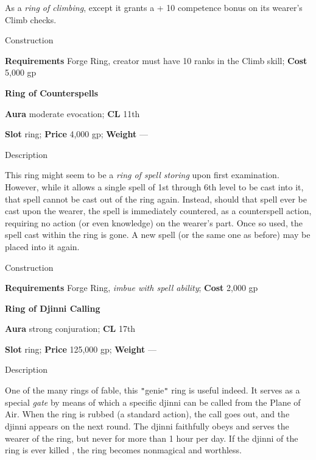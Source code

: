 As a \textit{ring of climbing}, except it grants a +
10 competence
 bonus on its wearer's Climb checks. 
				
Construction
				
\textbf{Requirements} Forge Ring, creator must have 10 ranks in the Climb skill; \textbf{Cost }5,000 gp
				
\textbf{Ring of Counterspells}
				
\textbf{Aura} moderate evocation;\textbf{ CL }11th
				
\textbf{Slot} ring; \textbf{Price} 4,000 gp; \textbf{Weight} ---
				
Description
				
This ring might seem to be a \textit{ring of spell storing }upon first examination. However, while it allows a single spell of 
1st
 through 6th level to be cast into it, that spell cannot be cast out of the ring again. Instead, should that spell ever be cast upon the wearer, the spell is immediately countered, as a counterspell action, requiring no action (or even knowledge) on the wearer's part. Once so used, the spell cast within the ring is gone. A new spell (or the same one as before) 
may be placed
 into it again. 
				
Construction
				
\textbf{Requirements} Forge Ring, \textit{imbue with spell ability}; \textbf{Cost }2,000 gp
				
\textbf{Ring of Djinni Calling}
				
\textbf{Aura} strong conjuration;\textbf{ CL }17th
				
\textbf{Slot} ring; \textbf{Price} 125,000 gp; \textbf{Weight} ---
				
Description
				
One of the many rings of fable, this \texttt{{}"{}}genie\texttt{{}"{}} ring is useful indeed. It serves as a special \textit{gate }by means of which a specific djinni 
can be called
 from the Plane of Air. 
When the ring is rubbed (a standard action), the call goes out, and the djinni appears on the next round.
 The djinni faithfully obeys and serves the wearer of the ring, but never for more than 1 hour per day. If the djinni of the ring 
is ever killed
, the ring becomes nonmagical and worthless. 
				
